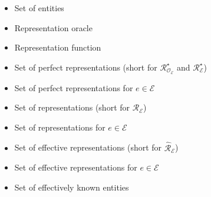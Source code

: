 \begin{itemize}[leftmargin=1.5cm]
%
%

\bigskip

\item [$\mathcal{E}$] Set of entities
\item [$\mathcal{O}_\mathcal{E}$] Representation oracle
\item [$\delta_{\mathcal{E}}$] Representation function


\item [$\mathcal{R}^{\star}$] Set of perfect representations (short for $\mathcal{R}_{\mathcal{O}_{\mathcal{E}}}^{\star}$ and $\mathcal{R}_{\mathcal{E}}^{\star}$)
\item [$\mathcal{R}_{e}^{\star}$] Set of perfect representations for $e \in \mathcal{E}$
\item [$\mathcal{R}$] Set of representations (short for $\mathcal{R}_{\mathcal{E}}$)
\item [$\mathcal{R}_{e}$] Set of representations for $e \in \mathcal{E}$
\item [$\hat{\mathcal{R}}$] Set of effective representations (short for $\hat{\mathcal{R}}_{\mathcal{E}}$)
\item [$\hat{\mathcal{R}}_{e}$] Set of effective representations for $e \in \mathcal{E}$
\item [$\hat{\mathcal{E}}$] Set of effectively known entities


\end{itemize}
